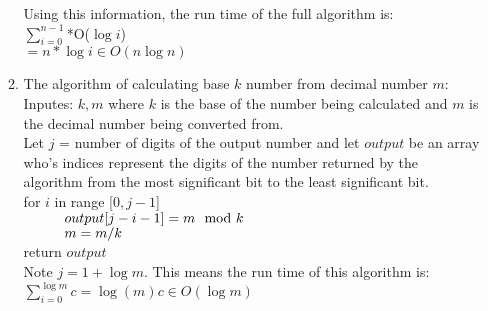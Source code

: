 \documentclass{article}
\newcommand\tab[1][1cm]{\hspace*{#1}}
\begin{document}
\begin{enumerate}
\begin{enumerate}
			Using this information, the run time of the full algorithm is:\\
			$\sum_{i=0}^{n-1}$*O($\log i$)\\
			$=n*\log i\in O(n\log n)$\\
			\item The algorithm of calculating base $k$ number from decimal number $m$:\\
			Inputes: $k,m$ where $k$ is the base of the number being calculated and $m$ is the 
			decimal number being converted from.\\
			Let $j$ = number of digits of the output number and let $output$ be an array who's 
			indices represent the digits of the number returned by the algorithm from the most 
			significant bit to the least significant bit.\\
			 for $i$ in range [$0, j-1$]\\
			 $\tab output[j-i-1] = m \mod k$\\
			 $\tab m=m/k$\\
			 return $output$\\
			Note $j=1+\log m$. This means the run time of this algorithm is:\\
			$\sum_{i=0}^{\log m}c=\log (m)c\in O(\log m)$\\
		\end{enumerate}
	\end{enumerate}
 
\end{document}

